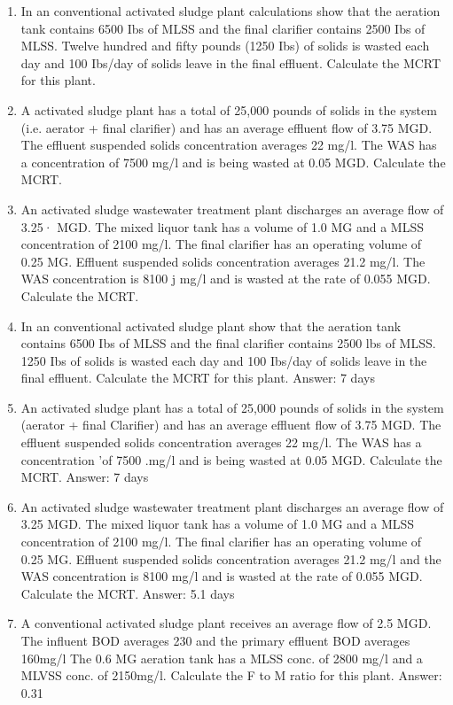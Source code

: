 \begin{enumerate}
\item In an conventional activated sludge plant calculations show that the aeration tank contains 6500 Ibs of MLSS and the final clarifier contains 2500 Ibs of MLSS. Twelve hundred and fifty pounds (1250 Ibs) of solids is wasted each day and 100 Ibs/day of solids leave in the final effluent. Calculate the MCRT for this plant.


\item A activated sludge plant has a total of 25,000 pounds of solids in the system (i.e. aerator + final clarifier) and has an average effluent flow of 3.75 MGD. The effluent suspended solids concentration averages 22 mg/l. The WAS has a concentration of 7500 mg/l and is being wasted at 0.05 MGD. Calculate the MCRT.


\item An activated sludge wastewater treatment plant discharges an average flow of 3.25· MGD. The mixed liquor tank has a volume of 1.0 MG and a MLSS concentration of 2100 mg/l. The final clarifier has an operating volume of 0.25 MG. Effluent suspended solids concentration averages 21.2 mg/l. The WAS concentration is 8100 j mg/l and is wasted at the rate of 0.055 MGD. Calculate the MCRT.

\item In an conventional activated sludge plant show that the aeration tank contains 6500 Ibs of MLSS and the final clarifier contains 2500 lbs of MLSS. 1250 Ibs of solids is wasted each day and 100 Ibs/day of solids leave in the final effluent. Calculate the MCRT for this plant.  Answer:  7 days

\item An activated sludge plant has a total of 25,000 pounds of solids in the system (aerator + final Clarifier) and has an average effluent flow of 3.75 MGD. The effluent suspended solids concentration averages 22 mg/l. The WAS has a concentration 'of 7500 .mg/l and is being wasted at 0.05 MGD. Calculate the MCRT.  Answer:  7 days

\item An activated sludge wastewater treatment plant discharges an average flow of 3.25 MGD. The mixed liquor tank has a volume of 1.0 MG and a MLSS concentration of 2100 mg/l. The final clarifier has an operating volume of 0.25 MG. Effluent suspended solids concentration averages 21.2 mg/l and the WAS concentration is 8100 mg/l and is wasted at the rate of 0.055 MGD.  Calculate the MCRT.  Answer: 5.1 days

\item A conventional activated sludge plant receives an average flow of 2.5 MGD. The influent BOD averages 230 and the primary effluent BOD averages 160mg/l The 0.6 MG aeration tank has a MLSS conc. of 2800 mg/l and a MLVSS conc. of 2150mg/l. Calculate  the F to M ratio for this plant.  Answer:  0.31


\end{enumerate}
